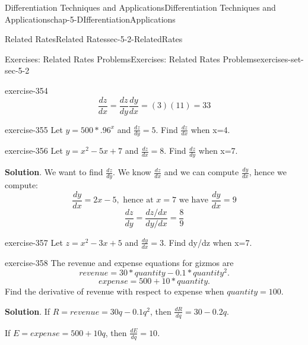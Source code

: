 \documentclass[oneside,10pt,]{book}
\numberwithin{equation}{section}
\begin{document}
\begin{chapterptx}{Differentiation Techniques and Applications}{}{Differentiation Techniques and Applications}{}{}{chap-5-DIfferentiationApplications}
\begin{sectionptx}{Related Rates}{}{Related Rates}{}{}{sec-5-2-RelatedRates}
\begin{exercises-subsection-numberless}{Exercises: Related Rates Problems}{}{Exercises: Related Rates Problems}{}{}{exercises-set-sec-5-2}
\begin{divisionexercise}{9}{}{}{exercise-354}
\begin{equation*}
\end{equation*}
%
\begin{equation*}
\frac{dz}{dx}=\frac{dz}{dy}\frac{dy}{dx}=(3)(11)=33
\end{equation*}
\end{divisionexercise}%
\begin{divisionexercise}{10}{}{}{exercise-355}%
\hypertarget{p-1989}{}%
Let \(y=500*.96^x\) and \(\frac{dz}{dy}=5\). Find \(\frac{dz}{dx}\) when x=4.%
\end{divisionexercise}%
\begin{divisionexercise}{11}{}{}{exercise-356}%
\hypertarget{p-1990}{}%
Let \(y=x^2-5x+7\) and \(\frac{dz}{dx}  =8\). Find \(\frac{dz}{dy}\) when x=7.%
\par\smallskip%
\noindent\textbf{Solution}.\hypertarget{solution-179}{}\quad%
\hypertarget{p-1991}{}%
We want to find \(\frac{dz}{dy}\). We know \(\frac{dz}{dx}\) and we can compute \(\frac{dy}{dx}\), hence we compute:%
%
\begin{equation*}
\frac{dy}{dx}=2x-5,\text{ hence at }x=7\text{ we have }\frac{dy}{dx}=9
\end{equation*}
%
\begin{equation*}
\frac{dz}{dy}=\frac{dz/dx}{dy/dx}=\frac{8}{9}
\end{equation*}
\end{divisionexercise}%
\begin{divisionexercise}{12}{}{}{exercise-357}%
\hypertarget{p-1992}{}%
Let \(z=x^2-3x+5\) and \(\frac{dy}{dx}  =3\). Find dy\slash{}dz when x=7.%
\end{divisionexercise}%
\begin{divisionexercise}{13}{}{}{exercise-358}%
\hypertarget{p-1993}{}%
The revenue and expense equations for gizmos are%
%
\begin{equation*}
revenue=30*quantity-0.1*quantity^2.
\end{equation*}
%
\begin{equation*}
expense=500+10*quantity.
\end{equation*}
\hypertarget{p-1994}{}%
Find the derivative of revenue with respect to expense when \(quantity=100\).%
\par\smallskip%
\noindent\textbf{Solution}.\hypertarget{solution-180}{}\quad%
\hypertarget{p-1995}{}%
If \(R= revenue=30q-0.1q^2\), then \(\frac{dR}{dq}=30-0.2q\).%
\par
\hypertarget{p-1996}{}%
If \(E= expense=500+10q\), then  \(\frac{dE}{dq}=10\).%
\par
\hypertarget{p-1997}{}%

\end{divisionexercise}
\end{exercises-subsection-numberless}
\end{sectionptx}
\end{chapterptx}
\end{document}

